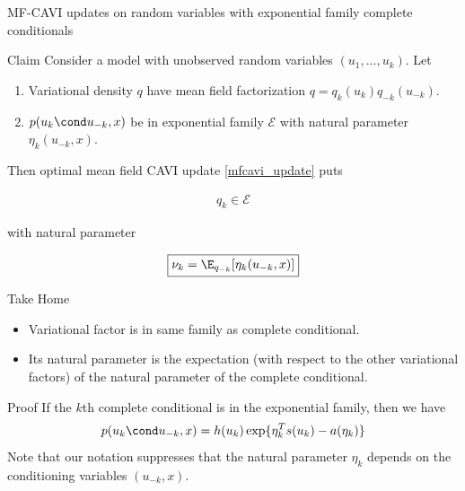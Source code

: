 \documentclass[10pt]{beamer}
\begin{document}
{\begin{frame}{MF-CAVI updates on random variables with exponential family complete conditionals}
	\scriptsize
	
	
	\begin{block}{Claim}
	\scriptsize
	Consider a model with unobserved random variables $(u_1,...,u_k)$.  Let 
	
	\begin{enumerate}
	\item Variational density $q$ have mean field factorization $q=q_k(u_k)q_{-k}(u_{-k})$. 
	\item $p(u_k \cond u_{-k}, x)$ be in exponential family $\mathcal{E}$ with natural parameter $\eta_k(u_{-k}, x)$.  
	\end{enumerate}
	
	Then optimal mean field CAVI update \eqref{mfcavi_update} puts
	
	\begin{align}
	\label{eqn:mf_cavi_efcc_0}
	q_k \in \mathcal{E}  
	\end{align}
	
	 with natural parameter 
	
	\begin{align}
	\label{eqn:mf_cavi_efcc}
	\boxed{\nu_k = \E_{q_{-k}} [\eta_k(u_{-k}, x)]}
	\end{align}
	\end{block}
	
	\begin{block}{Take Home}
	\scriptsize 
	\begin{itemize} 
	\item Variational factor is in same family as complete conditional.
	\item Its natural parameter is the expectation \tiny  (with respect to the other variational factors) \scriptsize of the natural parameter of the complete conditional.
	\end{itemize} 
	\end{block}
	
	\end{frame}
	
	\begin{frame}{Proof}
	If the $k$th complete conditional is in the exponential family, then we have 
	\begin{align}
	\label{eqn:efcc}
	 p(u_k \cond u_{-k}, x) = h(u_k) \exp \{ \eta_k^T s(u_k) - a(\eta_k)\} 
	 \end{align}
	\tiny Note that our notation suppresses that the natural parameter $\eta_k$ depends on the conditioning variables $(u_{-k}, x)$. \normalsize
	

\end{frame}}
\end{document}
